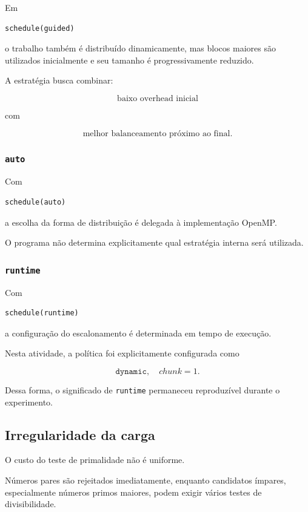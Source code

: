 Em

\begin{verbatim}
schedule(guided)
\end{verbatim}

o trabalho também é distribuído dinamicamente, mas blocos maiores são
utilizados inicialmente e seu tamanho é progressivamente reduzido.

A estratégia busca combinar:

\[
\text{baixo overhead inicial}
\]

com

\[
\text{melhor balanceamento próximo ao final}.
\]


\subsubsection{\texttt{auto}}

Com

\begin{verbatim}
schedule(auto)
\end{verbatim}

a escolha da forma de distribuição é delegada à implementação OpenMP.

O programa não determina explicitamente qual estratégia interna será
utilizada.


\subsubsection{\texttt{runtime}}

Com

\begin{verbatim}
schedule(runtime)
\end{verbatim}

a configuração do escalonamento é determinada em tempo de execução.

Nesta atividade, a política foi explicitamente configurada como

\[
\texttt{dynamic},\quad chunk=1.
\]

Dessa forma, o significado de \texttt{runtime} permaneceu reproduzível
durante o experimento.


\subsection{Irregularidade da carga}

O custo do teste de primalidade não é uniforme.

Números pares são rejeitados imediatamente, enquanto candidatos ímpares,
especialmente números primos maiores, podem exigir vários testes de
divisibilidade.

